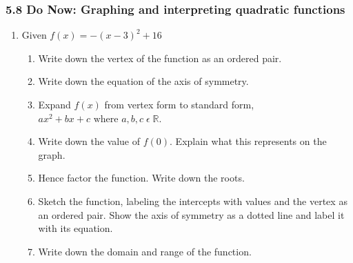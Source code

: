 \documentclass[12pt, twoside]{article}
\begin{document}
    \subsubsection*{5.8 Do Now: Graphing and interpreting quadratic functions}
    \begin{enumerate}

    \item   Given $f(x)=-(x-3)^2+16$
    \begin{enumerate}[itemsep=1.25cm]
        \item Write down the vertex of the function as an ordered pair.
        \item Write down the equation of the axis of symmetry.
        \item Expand $f(x)$ from vertex form to standard form, $ax^2+bx+c \text{ where } a, b, c \;  \epsilon \; \mathbb{R}$. \vspace{1cm}
        \item Write down the value of $f(0)$. Explain what this represents on the graph.
        \item Hence factor the function. Write down the roots.
        \item Sketch the function, labeling the intercepts with values and the vertex as an ordered pair. Show the axis of symmetry as a dotted line and label it with its equation.
        \begin{flushright}
          \end{flushright}
    
        \item Write down the domain and range of the function.
    \end{enumerate}
    
    
    \newpage

\end{enumerate}
\end{document}
